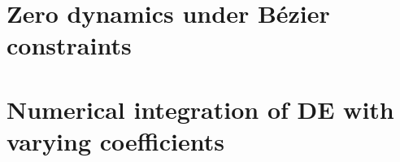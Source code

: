\section{Zero dynamics under Bézier constraints}


\section[Numerical integration method]{Numerical integration of DE with varying coefficients} \label{app:numint}
